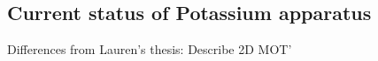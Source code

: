 
\subsection{Current status of Potassium apparatus}
Differences from Lauren's thesis:
	    Describe 2D MOT'